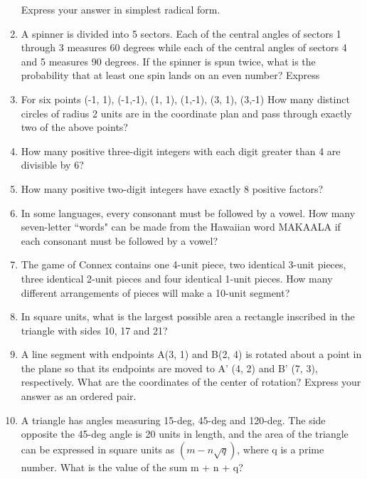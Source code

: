 \documentclass[12pt]{article}
\begin{document}
\begin{enumerate}
Express your answer in simplest radical form.
\item A spinner is divided into 5 sectors. Each of the central
angles of sectors 1 through 3 measures 60 degrees while each of the
central angles of sectors 4 and 5 measures 90 degrees. If the spinner is
spun twice, what is the probability that at least one spin lands
on an even number? Express
\item For six points (-1, 1), (-1,-1), (1, 1), (1,-1), (3, 1), (3,-1)
How many distinct circles of radius 2 units are in the
coordinate plan and pass through exactly two of the above points?
\bigskip
\item How many positive three-digit integers with each digit greater
than 4 are divisible by 6?
\vspace{1cm}
\item How many positive two-digit integers have exactly 8 positive factors?
\vspace{1cm}
\item In some languages, every consonant must be followed by a vowel. How many
seven-letter ``words" can be made from the Hawaiian word MAKAALA if each
consonant must be followed by a vowel?
\vspace{1cm}

\item The game of Connex contains one 4-unit piece, two identical 3-unit pieces, three
identical 2-unit pieces and four identical 1-unit pieces. How many different
arrangements of pieces will make a 10-unit segment?
\vspace{1cm}

\item In square units, what is the largest possible area a rectangle inscribed in the
triangle with sides 10, 17 and 21?
\vspace{1cm}

\item A line segment with endpoints A(3, 1) and B(2, 4) is rotated about a point in
the plane so that its endpoints are moved to A' (4, 2) and B' (7, 3), respectively.
What are the coordinates of the center of rotation? Express your answer as an
ordered pair.
\vspace{1cm}

\item A triangle has angles measuring 15-deg, 45-deg and 120-deg. The side opposite the 45-deg
angle is 20 units in length, and the area of the triangle can be expressed in
square units as $(m − n \sqrt{q})$, where q is a prime number. What is the value of
the sum m + n + q?
\vspace{1cm}


\end{enumerate}
\end{document}
